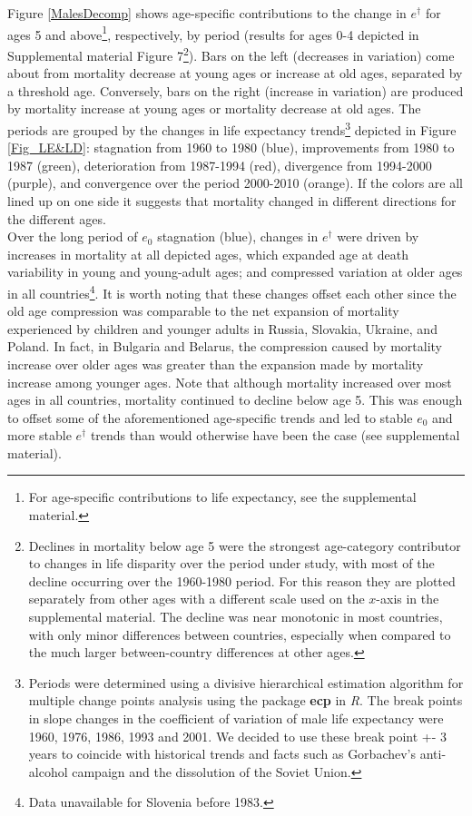 \documentclass{article}
\begin{document}
\begin{spacing}{1.5}
Figure  \ref{MalesDecomp} shows age-specific contributions to the change in $e^\dagger$ for ages 5 and above\footnote{For age-specific contributions to life expectancy, see the supplemental material.}, respectively, by period (results for ages 0-4 depicted in Supplemental material Figure 7\footnote{Declines in mortality below age 5 were the strongest age-category contributor to changes in life disparity over the period under study, with most of the decline occurring over the 1960-1980 period. For this reason they are plotted separately from other ages with a different scale used on the $x$-axis in the supplemental material. The decline was near monotonic in most countries, with only minor differences between countries, especially when compared to the much larger between-country differences at other ages.}). Bars on the left (decreases in variation) come about from mortality decrease at young ages or increase at old ages, separated by a threshold age. Conversely, bars on the right (increase in variation) are produced by mortality increase at young ages or mortality decrease at old ages. The periods are grouped by the changes in life expectancy trends\footnote{Periods were determined using a divisive hierarchical estimation algorithm for multiple change points analysis using the package \textbf{ecp} in \textit{R}. The break points in slope changes in the coefficient of variation of male life expectancy were 1960, 1976, 1986, 1993 and 2001. We decided to use these break point +- 3 years to coincide with historical trends and facts such as Gorbachev's anti-alcohol campaign and the dissolution of the Soviet Union.} depicted in Figure \ref{Fig_LE&LD}: stagnation from 1960 to 1980 (blue), improvements from 1980 to 1987 (green), deterioration from 1987-1994 (red), divergence from 1994-2000 (purple), and convergence over the period 2000-2010 (orange). If the colors are all lined up on one side it suggests that mortality changed in different directions for the different ages. \\


Over the long period of $e_0$ stagnation (blue), changes in $e^\dagger$ were driven by increases in mortality at all depicted ages, which expanded age at death variability in young and young-adult ages; and compressed variation at older ages in all countries\footnote{Data unavailable for Slovenia before 1983.}. It is worth noting that these changes offset each other since the old age compression was comparable to the net expansion of mortality experienced by children and younger adults in Russia, Slovakia, Ukraine, and Poland. In fact, in Bulgaria and Belarus, the compression caused by mortality increase over older ages was greater than the expansion made by mortality increase among younger ages. Note that although mortality increased over most ages in all countries, mortality continued to decline below age 5. This was enough to offset some of the aforementioned age-specific trends and led to stable $e_0$ and more stable $e^\dagger$ trends than would otherwise have been the case (see supplemental material).


\end{spacing}
\end{document}
